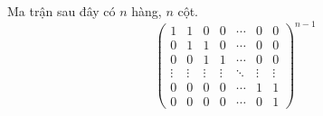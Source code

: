 \begin{exercise}
    Ma trận sau đây có $n$ hàng, $n$ cột.
    \[
        {\begin{pmatrix}
            1      & 1      & 0      & 0      & \cdots & 0      & 0      \\
            0      & 1      & 1      & 0      & \cdots & 0      & 0      \\
            0      & 0      & 1      & 1      & \cdots & 0      & 0      \\
            \vdots & \vdots & \vdots & \vdots & \ddots & \vdots & \vdots \\
            0      & 0      & 0      & 0      & \cdots & 1      & 1      \\
            0      & 0      & 0      & 0      & \cdots & 0      & 1
        \end{pmatrix}}^{n-1}
    \]
\end{exercise}

